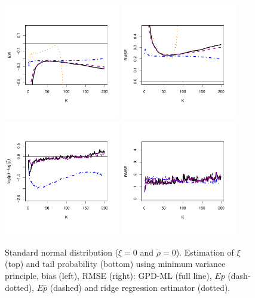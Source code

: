 \documentclass[twoside,leqno,11pt]{article}
\begin{document}
  \begin{figure}[!ht]
  \centering
\includegraphics[width=0.45\textwidth]{std_normalGPD_evi.pdf} 
\includegraphics[width=0.45\textwidth]{std_normalGPD_rmse.pdf} \\
\includegraphics[width=0.45\textwidth]{std_normalGPD_tail.pdf}
\includegraphics[width=0.45\textwidth]{std_normalGPD_tail_rmse.pdf}  
 \caption{ Standard normal distribution ($\xi=0$ and $\tilde\rho=0$). Estimation of $\xi$ (top) and tail probability (bottom) using minimum variance principle, bias (left), RMSE (right): GPD-ML (full line), $Ep$ (dash-dotted), $E\bar{p}$ (dashed) and ridge regression estimator (dotted).}
\end{figure}
\end{document}
